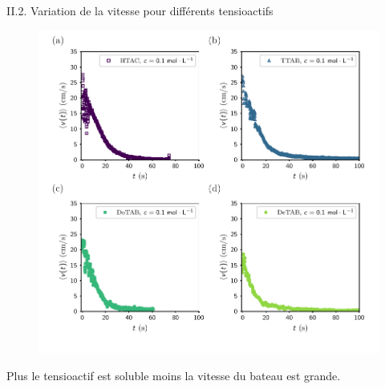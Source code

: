 \documentclass[aspectratio=169,10pt]{beamer}
\begin{document}
\begin{frame}{II.2. Variation de la vitesse pour différents tensioactifs}
    \begin{minipage}{8cm}
        \begin{figure}[!ht]
            \centering
            \includegraphics[scale=0.55]{./figures/Deceleration_vitesse_faible_concentration.pdf}
        \end{figure}
    \end{minipage}
    \begin{minipage}{5cm}
        \begin{table}
            \centering
            \caption{Tableau des vitesses initiales}
          \end{table}
          \begin{ombretheo}
            \begin{theo}
              Plus le tensioactif est soluble moins la vitesse du bateau est grande.
            \end{theo}
          \end{ombretheo}
    \end{minipage}
\end{frame}
\end{document}
